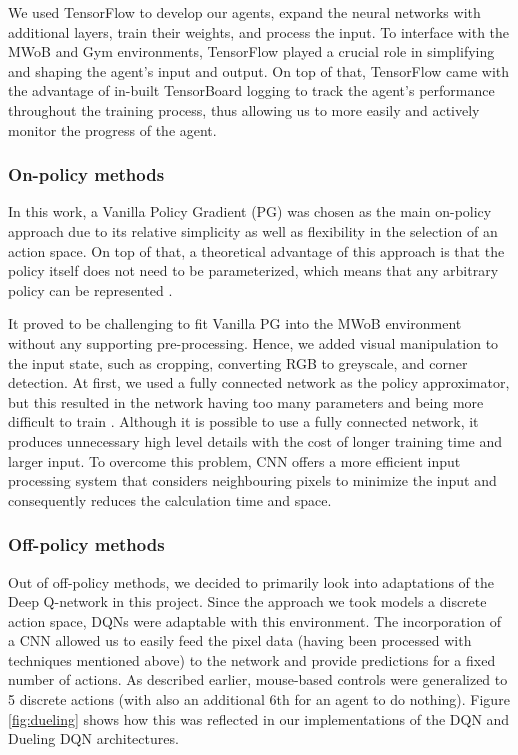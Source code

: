 \documentclass[10pt,journal,compsoc]{IEEEtran}
\begin{document}
We used TensorFlow to develop our agents, expand the neural networks with additional layers, train their weights, and process the input. To interface with the MWoB and Gym environments, TensorFlow played a crucial role in simplifying and shaping the agent's input and output. On top of that, TensorFlow came with the advantage of in-built TensorBoard logging to track the agent's performance throughout the training process, thus allowing us to more easily and actively monitor the progress of the agent.

\subsubsection{On-policy methods}  
In this work, a Vanilla Policy Gradient (PG) was chosen as the main on-policy approach due to its relative simplicity as well as flexibility in the selection of an action space.
On top of that, a theoretical advantage of this approach is that the policy itself does not need to be parameterized, which means that any arbitrary policy can be represented \cite{Peters:2010}.

It proved to be challenging to fit Vanilla PG into the MWoB environment without any supporting pre-processing. Hence, we added visual manipulation to the input state, such as cropping, converting RGB to greyscale, and corner detection. At first, we used a fully connected network as the policy approximator, but this resulted in the network having too many parameters and being more difficult to train \cite{LongSD14}. Although it is possible to use a fully connected network, it produces unnecessary high level details with the cost of longer training time and larger input. To overcome this problem, CNN offers a more efficient input processing system that considers neighbouring pixels to minimize the input and consequently reduces the calculation time and space.

\subsubsection{Off-policy methods}  
Out of off-policy methods, we decided to primarily look into adaptations of the Deep Q-network in this project.
Since the approach we took models a discrete action space, DQNs were adaptable with this environment. The incorporation of a CNN allowed us to easily feed the pixel data (having been processed with techniques mentioned above) to the network and provide predictions for a fixed number of actions. As described earlier, mouse-based controls were generalized to 5 discrete actions (with also an additional 6th for an agent to do nothing). Figure \ref{fig:dueling} shows how this was reflected in our implementations of the DQN and Dueling DQN architectures.
\end{document}
